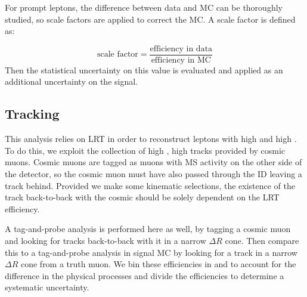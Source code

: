 For prompt leptons, the difference between data and \ac{MC} can be thoroughly studied, so scale factors are applied to correct the MC. A scale factor is defined as:

\begin{equation}
\text{scale factor} = \frac{\text{efficiency in data}}{\text{efficiency in MC}}
\end{equation}
Then the statistical uncertainty on this value is evaluated and applied as an additional uncertainty on the signal. 

\subsection{Tracking}
This analysis relies on \ac{LRT} in order to reconstruct leptons with high \pt and high \absdz. To do this, we exploit the collection of high \pt, high \absdz tracks provided by cosmic muons. Cosmic muons are tagged as muons with \ac{MS} activity on the other side of the detector, so the cosmic muon must have also passed through the \ac{ID} leaving a track behind. Provided we make some kinematic selections, the existence of the track back-to-back with the cosmic should be solely dependent on the LRT efficiency.

A tag-and-probe analysis is performed here as well, by tagging a cosmic muon and looking for tracks back-to-back with it in a narrow $\Delta R$ cone. Then compare this to a tag-and-probe analysis in signal \ac{MC} by looking for a track in a narrow $\Delta R$ cone from a truth muon. We bin these efficiencies in \pt and \dz to account for the difference in the physical processes and divide the efficiencies to determine a systematic uncertainty. 

